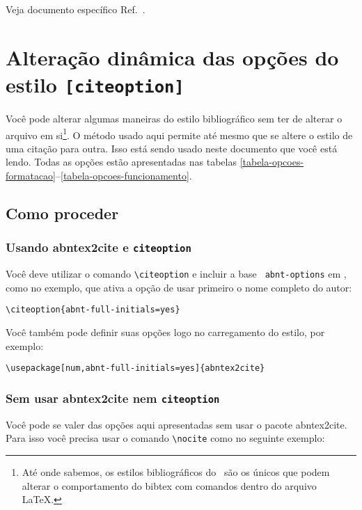 \documentclass[a4paper]{ltxdoc}
\begin{document}
Veja documento específico Ref.~.

\section{Alteração dinâmica das opções do estilo \texttt{[citeoption]}}

\label{chapter-opcoes-estilo}

Você pode alterar algumas maneiras do estilo bibliográfico sem ter de alterar o
arquivo em si\footnote{Até onde sabemos, os estilos bibliográficos do \abnTeX\
são os únicos que podem alterar o comportamento do \textsf{bibtex} com comandos
dentro do arquivo \LaTeX.}. O método usado aqui permite até mesmo que se altere o estilo
de uma citação para outra. Isso está sendo usado neste documento que você está
lendo. Todas as opções estão apresentadas nas tabelas
\ref{tabela-opcoes-formatacao}--\ref{tabela-opcoes-funcionamento}.

\subsection{Como proceder}

\subsubsection{Usando \textsf{abntex2cite} e \texttt{citeoption}}

\DescribeMacro{\citeoption}
Você deve utilizar o comando \verb+\citeoption+ e incluir a base \texttt{
abnt-options} em \verb++, como no exemplo, que ativa a opção de
usar primeiro o nome completo do autor:

\begin{verbatim}
\citeoption{abnt-full-initials=yes}
\end{verbatim}

Você também pode definir suas opções logo no carregamento do estilo, por
exemplo:

\begin{verbatim}
\usepackage[num,abnt-full-initials=yes]{abntex2cite}
\end{verbatim}

\subsubsection{Sem usar \textsf{abntex2cite} nem \texttt{citeoption}}

\DescribeMacro{\nocite}
Você pode se valer das opções aqui apresentadas sem usar o pacote
\textsf{abntex2cite}. Para isso você precisa usar o comando \verb+\nocite+ como
no seguinte exemplo:
\end{document}
